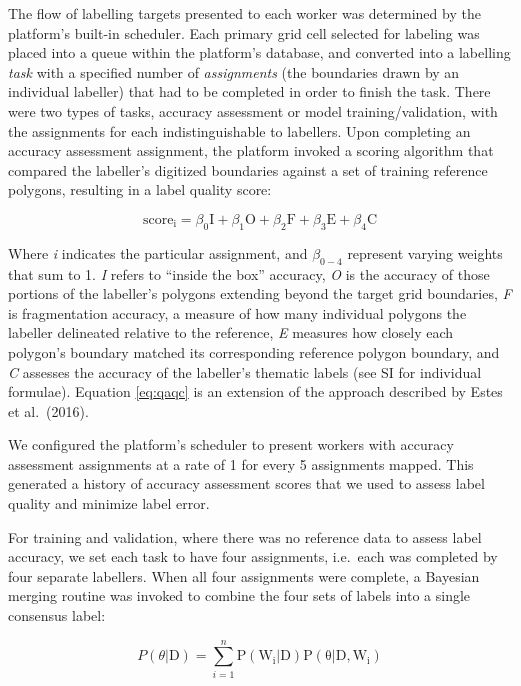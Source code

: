 \documentclass[11pt,a4paper]{article}
\begin{document}
The flow of labelling targets presented to each worker was determined by
the platform's built-in scheduler. Each primary grid cell selected for
labeling was placed into a queue within the platform's database, and
converted into a labelling \emph{task} with a specified number of
\emph{assignments} (the boundaries drawn by an individual labeller) that
had to be completed in order to finish the task. There were two types of
tasks, accuracy assessment or model training/validation, with the
assignments for each indistinguishable to labellers. Upon completing an
accuracy assessment assignment, the platform invoked a scoring algorithm
that compared the labeller's digitized boundaries against a set of
training reference polygons, resulting in a label quality score:

\begin{equation} \label{eq:qaqc}
\mathrm{score_i}=\beta_0\mathrm{I}+\beta_1\mathrm{O}+\beta_2\mathrm{F}+\beta_3\mathrm{E}+\beta_4\mathrm{C}
\end{equation}

Where \emph{i} indicates the particular assignment, and \(\beta_{0-4}\)
represent varying weights that sum to 1. \emph{I} refers to ``inside the
box'' accuracy, \emph{O} is the accuracy of those portions of the
labeller's polygons extending beyond the target grid boundaries,
\emph{F} is fragmentation accuracy, a measure of how many individual
polygons the labeller delineated relative to the reference, \emph{E}
measures how closely each polygon's boundary matched its corresponding
reference polygon boundary, and \emph{C} assesses the accuracy of the
labeller's thematic labels (see SI for individual formulae). Equation
\ref{eq:qaqc} is an extension of the approach described by Estes et
al.~(2016).

We configured the platform's scheduler to present workers with accuracy
assessment assignments at a rate of 1 for every 5 assignments mapped.
This generated a history of accuracy assessment scores that we used to
assess label quality and minimize label error.

For training and validation, where there was no reference data to assess
label accuracy, we set each task to have four assignments, i.e.~each was
completed by four separate labellers. When all four assignments were
complete, a Bayesian merging routine was invoked to combine the four
sets of labels into a single consensus label:

\begin{equation}
P(\theta|\mathrm{D})=\sum_{i=1}^{n}\mathrm{P}(\mathrm{W_i}|\mathrm{D})\mathrm{P}(\mathrm{\theta}|\mathrm{D}, \mathrm{W_i})
\end{equation}
\end{document}
